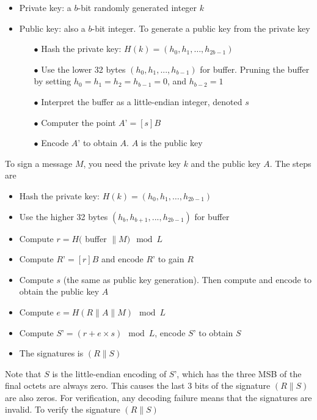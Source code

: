 \begin{itemize}
  \item Private key: a $b$-bit randomly generated integer $k$
  \item Public key: also a $b$-bit integer. To generate a public key from the private key

        \begin{itemize}
          \item[$\bullet$] Hash the private key: $H(k) = (h_0, h_1,…, h_{2b-1})$
          \item[$\bullet$] Use the lower 32 bytes $(h_0, h_1,..., h_{b-1})$ for buffer. Pruning the buffer by setting $h_0 = h_1 = h_2= h_{b-1} = 0$, and $h_{b-2} = 1$
          \item[$\bullet$] Interpret the buffer as a little-endian integer, denoted $s$
          \item[$\bullet$] Computer the point $A’ = [s]B$
          \item[$\bullet$] Encode $A’$ to obtain $A$. $A$ is the public key
        \end{itemize}

\end{itemize}

To sign a message $M$, you need the private key $k$ and the public key $A$. The steps are

\begin{itemize}
  \item Hash the private key:  $H(k) = (h_0, h_1 ,…, h_{2b-1})$
  \item Use the higher 32 bytes $(h_b, h_{b+1},..., h_{2b-1})$ for buffer
  \item Compute $r = H($ buffer $\| M) \mod L$
  \item Compute $R’ = [r]B$ and encode $R’$ to gain $R$
  \item Compute $s$ (the same as public key generation). Then compute and encode to obtain the public key $A$
  \item Compute $e = H(R\|A\|M) \mod L$
  \item Compute $S’ = (r+e \times s) \mod L$, encode $S’$ to obtain $S$
  \item The signatures is $(R \| S)$
\end{itemize}

Note that $S$ is the little-endian encoding of $S’$, which has the three MSB of the final octets are always zero. This causes the last 3 bits of the signature $(R \| S)$ are also zeros. For verification, any decoding failure means that the signatures are invalid. To verify the signature $(R \| S)$\\

